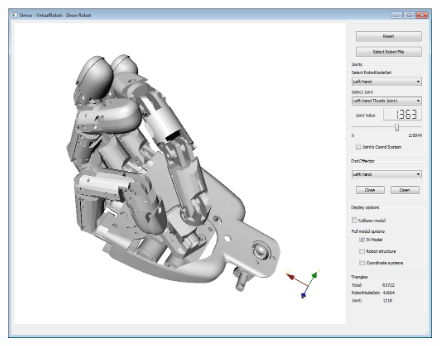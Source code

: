 \begin{figure}[H]
	\centering
	\begin{minipage} {.45\linewidth}
	  \includegraphics[width=\linewidth]{Tutorial9c}
	\end{minipage}
\end{figure}
\par
